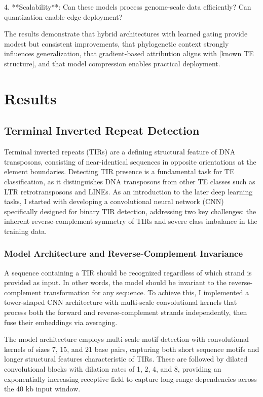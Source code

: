 \documentclass[12pt]{article}
\begin{document}
4. **Scalability**: Can these models process genome-scale data efficiently? Can quantization enable edge deployment?

The results demonstrate that hybrid architectures with learned gating provide modest but consistent improvements, that phylogenetic context strongly influences generalization, that gradient-based attribution aligns with [known TE structure], and that model compression enables practical deployment.
\fi

\newpage
\section{Results}

\subsection{Terminal Inverted Repeat Detection}

Terminal inverted repeats (TIRs) are a defining structural feature of DNA transposons, consisting of near-identical sequences in opposite orientations at the element boundaries. Detecting TIR presence is a fundamental task for TE classification, as it distinguishes DNA transposons from other TE classes such as LTR retrotransposons and LINEs. As an introduction to the later deep learning tasks, I started with developing a convolutional neural network (CNN) specifically designed for binary TIR detection, addressing two key challenges: the inherent reverse-complement symmetry of TIRs and severe class imbalance in the training data.

\subsubsection{Model Architecture and Reverse-Complement Invariance}\label{ssec:tir}

A sequence containing a TIR should be recognized regardless of which strand is provided as input. In other words, the model should be invariant to the reverse-complement transformation for any sequence. To achieve this, I implemented a tower-shaped CNN architecture with multi-scale convolutional kernels that process both the forward and reverse-complement strands independently, then fuse their embeddings via averaging. 

The model architecture employs multi-scale motif detection with convolutional kernels of sizes 7, 15, and 21 base pairs, capturing both short sequence motifs and longer structural features characteristic of TIRs. These are followed by dilated convolutional blocks with dilation rates of 1, 2, 4, and 8, providing an exponentially increasing receptive field to capture long-range dependencies across the 40 kb input window.
\end{document}
